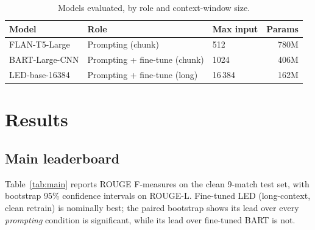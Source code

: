 \documentclass[10pt,a4paper]{article}
\begin{document}
\begin{table}[h]
\centering\small
\begin{tabular}{lllr}
\toprule
\textbf{Model} & \textbf{Role} & \textbf{Max input} & \textbf{Params} \\
\midrule
FLAN-T5-Large \citep{chung2022flan} & Prompting (chunk) & 512 & 780M \\
BART-Large-CNN \citep{lewis2020bart} & Prompting + fine-tune (chunk) & 1024 & 406M \\
LED-base-16384 \citep{beltagy2020longformer} & Prompting + fine-tune (long) & 16\,384 & 162M \\
\bottomrule
\end{tabular}
\caption{Models evaluated, by role and context-window size.}
\label{tab:models}
\end{table}

\section{Results}
\label{sec:results}

\subsection{Main leaderboard}
Table~\ref{tab:main} reports ROUGE F-measures on the clean 9-match test set, with bootstrap 95\% confidence intervals on ROUGE-L. Fine-tuned LED (long-context, clean retrain) is nominally best; the paired bootstrap shows its lead over every \emph{prompting} condition is significant, while its lead over fine-tuned BART is not.
\end{document}

